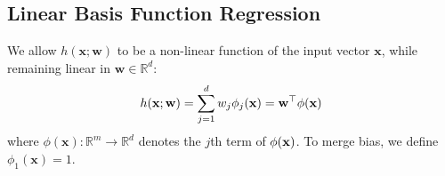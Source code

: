 \documentclass[11pt,letterpaper]{article}
\begin{document}
\subsection{Linear Basis Function Regression}
We allow $h(\mathbf{x};\mathbf{w})$ to be a non-linear function of the input vector $\mathbf{x}$, while remaining linear in $\mathbf{w} \in \mathbb{R}^d$:
\begin{align}
    h(\mathbf{x};\mathbf{w})= \sum_{j=1}^{d}w_j\phi_j(\mathbf{x})
    =\mathbf{w}^\top\mathbf{\mathbf{\phi}}(\mathbf{x})
\end{align}
where $\phi(\mathbf{x}) : \mathbb{R}^m \rightarrow \mathbb{R}^d$ denotes the $j$th term of $\mathbf{\phi}(\mathbf{x})$. To merge bias, we define $\phi_1(\mathbf{x})=1$.

\newpage
\end{document}
